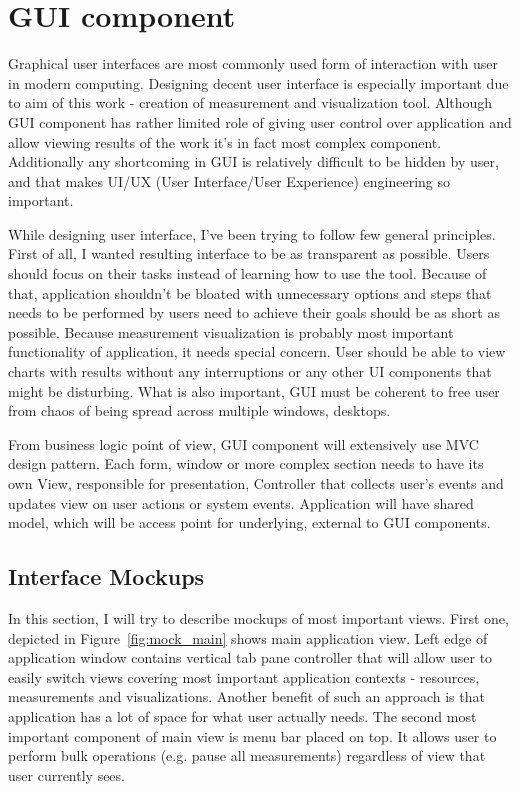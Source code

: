 %
\section{GUI component}
\label{sec:arch_gui}

Graphical user interfaces are most commonly used form of interaction with user in modern computing. Designing decent user interface is especially important due to aim of this work - creation of measurement and visualization tool. Although GUI component has rather limited role of giving user control over application and allow viewing results of the work it's in fact most complex component. Additionally any shortcoming in GUI is relatively difficult to be hidden by user, and that makes UI/UX (User Interface/User Experience) engineering so important.

While designing user interface, I've been trying to follow few general principles. First of all, I wanted resulting interface to be as transparent as possible. Users should focus on their tasks instead of learning how to use the tool. Because of that, application shouldn't be bloated with unnecessary options and steps that needs to be performed by users need to achieve their goals should be as short as possible. Because measurement visualization is probably most important functionality of application, it needs special concern. User should be able to view charts with results without any interruptions or any other UI components that might be disturbing. What is also important, GUI must be coherent to free user from chaos of being spread across multiple windows, desktops. 

From business logic point of view, GUI component will extensively use MVC design pattern\cite{gamma1995}. Each form, window or more complex section needs to have its own View, responsible for presentation, Controller that collects user's events and updates view on user actions or system events. Application will have shared model, which will be access point for underlying, external to GUI components.

\subsection{Interface Mockups}

In this section, I will try to describe mockups of most important views. First one, depicted in Figure~\ref{fig:mock_main} shows main application view. Left edge of application window contains vertical tab pane controller that will allow user to easily switch views covering most important application contexts - resources, measurements and visualizations. Another benefit of such an approach is that application has a lot of space for what user actually needs. The second most important component of main view is menu bar placed on top. It allows user to perform bulk operations (e.g. pause all measurements) regardless of view that user currently sees. 

